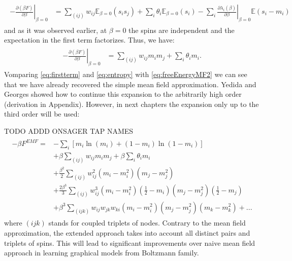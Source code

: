 \begin{align}
\begin{split}
 - \left. \frac{\partial (\beta F)}{\partial \beta}\right|_{\beta = 0} & =  \sum_{(ij)} w_{ij} \mathbb{E}_{\beta =0}(s_i s_j) + \sum_i \theta_i \mathbb{E}_{\beta =0}(s_i) - \sum_i  \left.\frac{\partial\lambda_i (\beta)}{\partial \beta}\right|_{\beta = 0}\mathbb{E}(s_i - m_i) 
 \end{split}
\end{align}
and as it was observed earlier, at $\beta =0$ the spins are independent and the expectation in the first term factorizes. Thus, we have:
\begin{align}
\begin{split}
 - \left. \frac{\partial (\beta F)}{\partial \beta}\right|_{\beta = 0} & =  \sum_{(ij)} w_{ij} m_i m_j +  \sum_i \theta_i m_i.
 \label{eq:firstterm} 
 \end{split}
\end{align}
Vomparing \ref{eq:firstterm} and \ref{eq:entropy} with \ref{eq:freeEnergyMF2} we can see that we have already recovered the simple mean field approximation. Yedida and Georges \cite{georges1991expand} showed how to continue this expansion to the arbitrarily high order (derivation in Appendix). However, in next chapters the expansion only up to the third order will be used:

TODO ADDD ONSAGER TAP NAMES
\begin{align*}
\begin{split}
-\beta F^{EMF} = & - \sum_i \left[m_i\ln (m_i) +  (1 - m_i)\ln \left( 1-m_i \right)\right]  \\
& + \beta \sum_{(ij)} w_{ij} m_i m_j + \beta \sum_i \theta_i m_i\\
& + \frac{\beta^2}{2} \sum_{(ij)} w_{ij}^2 (m_i - m_i^2)(m_j-m_j^2)\\
& + \frac{2\beta^3}{3} \sum_{(ij)} w_{ij}^3 (m_i - m_i^2)(\frac{1}{2} - m_i)(m_j - m_j^2)(\frac{1}{2} - m_j)\\
& +\beta^3 \sum_{(ijk)} w_{ij}w_{jk}w_{ki} (m_i - m_i^2)(m_j - m_j^2)(m_k - m_k^2) + ...
\label{eq:EMFexpansion}
\end{split}
\end{align*}
where $(ijk)$ stands for coupled triplets of nodes. Contrary to the mean field approximation, the extended approach takes into account all distinct pairs and triplets of spins. This will lead to significant improvements over naive mean field approach
in learning graphical models from Boltzmann family.

